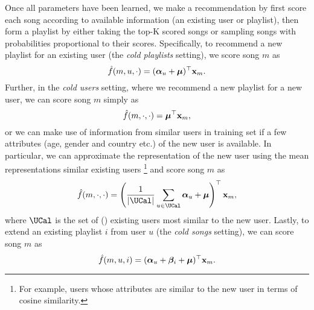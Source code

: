 Once all parameters have been learned, 
we make a recommendation by first score each song according to available information (\eg an existing user or playlist),
then form a playlist by either taking the top-K scored songs or sampling songs with probabilities proportional to their scores.
Specifically, to recommend a new playlist for an existing user (\ie the \emph{cold playlists} setting),
we score song $m$ as 
$$
\hat f(m, u, \cdot) = ({\bm{\alpha}}_u + \bm{\mu})^\top \mathbf{x}_m.
$$
Further, in the \emph{cold users} setting, where we recommend a new playlist for a new user,
we can score song $m$ simply as
$$
\hat f(m, \cdot, \cdot) = \bm{\mu}^\top \mathbf{x}_m,
$$
or we can make use of information from similar users in training set if a few attributes 
(\eg age, gender and country etc.) of the new user is available.
In particular, we can approximate the representation of the new user using the mean representations similar existing users
\footnote{For example, users whose attributes are similar to the new user in terms of cosine similarity.} 
and score song $m$ as
$$
\hat f(m, \cdot, \cdot) = \left( \frac{1}{|\UCal|} \sum_{u \in \UCal} \alphabm_u + \bmu \right)^\top \x_m,
$$
where $\UCal$ is the set of () existing users most similar to the new user.
Lastly, to extend an existing playlist $i$ from user $u$ (\ie the \emph{cold songs} setting),
we can score song $m$ as
$$
\hat f(m, u, i) = ({\bm{\alpha}}_u + {\bm{\beta}}_i + \bm{\mu})^\top \mathbf{x}_m.
$$




